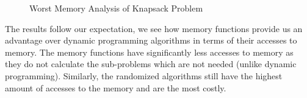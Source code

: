 \documentclass[a4paper, 11pt]{article}
\begin{document}
\begin{figure}[!ht] 
  \caption{Worst Memory Analysis of Knapsack Problem} 
  \centering
  \label{fig:WorstMemoryeAnalysis}
\end{figure}

\newpage

The results follow our expectation, we see how memory functions provide us an advantage over dynamic programming algorithms in terms of their accesses to memory. The memory functions have significantly less accesses to memory as they do not calculate the sub-problems which are not needed (unlike dynamic programming). Similarly, the randomized algorithms still have the highest amount of accesses to the memory and are the most costly.
\end{document}
